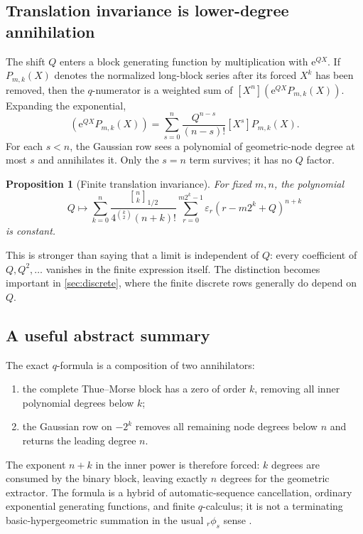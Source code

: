 \documentclass[11pt,oneside]{article}
\newtheorem{proposition}[theorem]{Proposition}
\theoremstyle{definition}
\theoremstyle{remark}
\newcommand{\e}{\mathrm e}
\newcommand{\qbinom}[3]{\genfrac{[}{]}{0pt}{}{#1}{#2}_{#3}}
\newcommand{\tm}{\varepsilon}
\begin{document}
\subsection{Translation invariance is lower-degree annihilation}

The shift $Q$ enters a block generating function by multiplication with $\e^{QX}$.  If
\(
 P_{m,k}(X)
\)
denotes the normalized long-block series after its forced $X^k$ has been removed, then the
$q$-numerator is a weighted sum of $[X^n](\e^{QX}P_{m,k}(X))$.  Expanding the exponential,
\begin{equation}
 [X^n](\e^{QX}P_{m,k}(X))
 =\sum_{s=0}^{n}\frac{Q^{n-s}}{(n-s)!}[X^s]P_{m,k}(X).     \label{eq:Q-expansion}
\end{equation}
For each $s<n$, the Gaussian row sees a polynomial of geometric-node degree at most $s$ and
annihilates it.  Only the $s=n$ term survives; it has no $Q$ factor.

\begin{proposition}[Finite translation invariance]
\label{prop:finite-Q-invariance}
For fixed $m,n$, the polynomial
\begin{equation}
 Q\longmapsto
 \sum_{k=0}^{n}
 \frac{\qbinom nk{1/2}}{4^{\binom k2}(n+k)!}
 \sum_{r=0}^{m2^k-1}\tm_r(r-m2^k+Q)^{n+k}                 \label{eq:Q-polynomial}
\end{equation}
is constant.
\end{proposition}

This is stronger than saying that a limit is independent of $Q$: every coefficient of
$Q,Q^2,\ldots$ vanishes in the finite expression itself.  The distinction becomes important
in \cref{sec:discrete}, where the finite discrete rows generally do depend on $Q$.

\subsection{A useful abstract summary}

The exact $q$-formula is a composition of two annihilators:
\begin{enumerate}
\item the complete Thue--Morse block has a zero of order $k$, removing all inner polynomial
      degrees below $k$;
\item the Gaussian row on $-2^k$ removes all remaining node degrees below $n$ and returns the
      leading degree $n$.
\end{enumerate}
The exponent $n+k$ in the inner power is therefore forced: $k$ degrees are consumed by the
binary block, leaving exactly $n$ degrees for the geometric extractor.  The formula is a
hybrid of automatic-sequence cancellation, ordinary exponential generating functions, and
finite $q$-calculus; it is not a terminating basic-hypergeometric summation in the usual
${}_r\phi_s$ sense \cite{gasper2004,dlmf17}.
\end{document}
